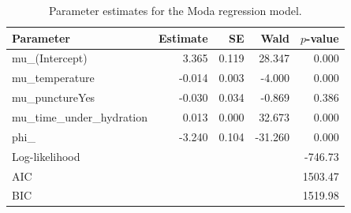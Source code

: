 \begin{table}[ht]
\centering
\caption{Parameter estimates for the Moda regression model.}
\label{tab:moda}
\begin{tabular}{lrrrr}
\toprule
Parameter & Estimate & SE & Wald & $p$-value\\
\midrule
mu_(Intercept) & 3.365 & 0.119 & 28.347 & 0.000\\
mu_temperature & -0.014 & 0.003 & -4.000 & 0.000\\
mu_punctureYes & -0.030 & 0.034 & -0.869 & 0.386\\
mu_time_under_hydration & 0.013 & 0.000 & 32.673 & 0.000\\
phi_ & -3.240 & 0.104 & -31.260 & 0.000\\
\midrule
Log-likelihood & \multicolumn{4}{r}{-746.73}\\
AIC & \multicolumn{4}{r}{1503.47}\\
BIC & \multicolumn{4}{r}{1519.98}\\
\bottomrule
\end{tabular}
\end{table}

